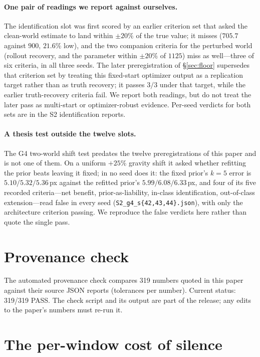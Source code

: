 \documentclass{article}
\begin{document}
\paragraph{One pair of readings we report against ourselves.} The identification slot was first scored by an earlier criterion set that asked the clean-world estimate to land within $\pm20\%$ of the true value; it misses ($705.7$ against $900$, $21.6\%$ low), and the two companion criteria for the perturbed world (rollout recovery, and the parameter within $\pm20\%$ of $1125$) miss as well---three of six criteria, in all three seeds. The later preregistration of \S\ref{sec:floor} supersedes that criterion set by treating this fixed-start optimizer output as a replication target rather than as truth recovery; it passes $3/3$ under that target, while the earlier truth-recovery criteria fail. We report both readings, but do not treat the later pass as multi-start or optimizer-robust evidence. Per-seed verdicts for both sets are in the S2 identification reports.

\paragraph{A thesis test outside the twelve slots.} The G4 two-world shift test predates the twelve preregistrations of this paper and is not one of them. On a uniform $+25\%$ gravity shift it asked whether refitting the prior beats leaving it fixed; in no seed does it: the fixed prior's $k{=}5$ error is $5.10/5.32/5.36$\,px against the refitted prior's $5.99/6.08/6.33$\,px, and four of its five recorded criteria---net benefit, prior-as-liability, in-class identification, out-of-class extension---read false in every seed (\texttt{S2\_g4\_s\{42,43,44\}.json}), with only the architecture criterion passing. We reproduce the false verdicts here rather than quote the single pass.




\section{Provenance check}\label{app:provenance}
The automated provenance check compares 319 numbers quoted in this paper against their source JSON reports (tolerances per number). Current status: 319/319 PASS. The check script and its output are part of the release; any edits to the paper's numbers must re-run it.


\section{The per-window cost of silence}\label{app:silence_cost}
\end{document}
